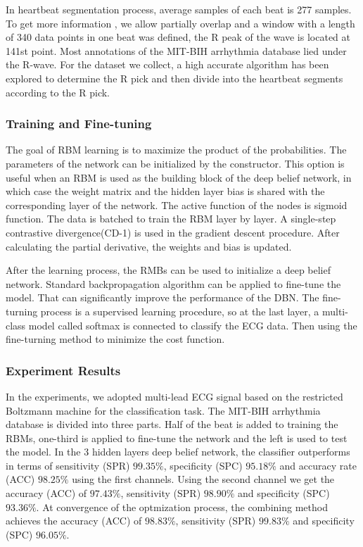\documentclass[graybox]{svmult}
\begin{document}
In heartbeat segmentation process, average samples of each beat is 277 samples. To get more information , we allow partially overlap and a window with a length of 340 data points in one beat was defined, the R peak of the wave is located at 141st point. Most annotations of the MIT-BIH arrhythmia database lied under the R-wave. For the dataset we collect, a high accurate algorithm has been explored to determine the R pick and then divide into the heartbeat segments according to the R pick.

\subsubsection{Training and Fine-tuning}
The goal of RBM learning is to maximize the product of the probabilities. The parameters of the network can be initialized by the constructor. This option is useful when an RBM is used as the building block of the deep belief network, in which case the weight matrix and the hidden layer bias is shared with the corresponding layer of the network. The active function of the nodes is sigmoid function. The data is batched to train the RBM layer by layer. A single-step contrastive divergence(CD-1) \citep{carreira2005contrastive} is used in the gradient descent procedure. After calculating the partial derivative, the weights and bias is updated.

After the learning process, the RMBs can be used to initialize a deep belief network. Standard backpropagation algorithm can be applied to fine-tune the model. That can significantly improve the performance of the DBN. The fine- turning process is a supervised learning procedure, so at the last layer, a multi-class model called softmax is connected to classify the ECG data. Then using the fine-turning method to minimize the cost function.

\subsubsection{Experiment Results}

In the experiments, we adopted multi-lead ECG signal based on the restricted Boltzmann machine for the classification task. The MIT-BIH arrhythmia database is divided into three parts. Half of the beat is added to training the RBMs, one-third is applied to fine-tune the network and the left is used to test the model. In the 3 hidden layers deep belief network, the classifier outperforms in terms of sensitivity (SPR) $99.35\%$, specificity (SPC) $95.18\%$ and accuracy rate (ACC) $98.25\%$ using the first channels. Using the second channel we get the accuracy (ACC) of $97.43\%$, sensitivity (SPR) $98.90\%$ and specificity (SPC) $93.36\%$. At convergence of the optmization process, the combining method achieves the accuracy (ACC) of $98.83\%$, sensitivity (SPR) $99.83\%$ and specificity (SPC) $96.05\%$.
\end{document}
